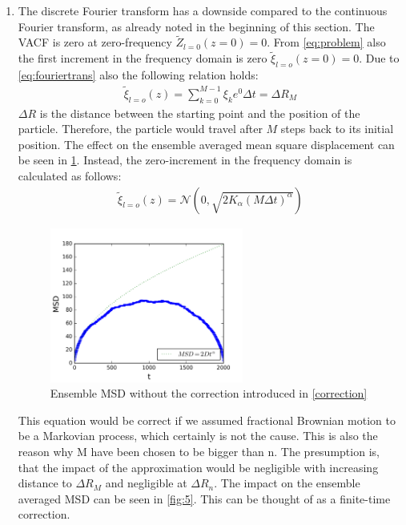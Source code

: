 \documentclass[
  a4paper,BCOR10mm,oneside,
  bibtotoc,idxtotoc,
  headsepline,footsepline,%
  fleqn,openbib
]{scrbook}
\begin{document}
\begin{enumerate}
 \item The discrete Fourier transform has a downside compared to the continuous Fourier transform, as already noted in the beginning of this section. The VACF is zero at zero-frequency $ \tilde{Z}_{l=0}(z=0)=0$.  From \cref{eq:problem} also the first increment in the frequency domain is zero $ \tilde{\xi}_{l=o}(z=0)= 0$. Due to \cref{eq:fouriertrans} also the following relation holds:
 \begin{align}
   \tilde{\xi}_{l=o}(z) = \sum_{k=0}^{M-1} \xi_k e^{0} \Delta t = \Delta  R_{M} \label{correction}
 \end{align}
$\Delta R $ is the distance between the starting point and the position of the particle. Therefore, the particle would travel after $M$ steps back to its initial position. The effect on the ensemble averaged mean square displacement can be seen in \cref{fig:6}. Instead, the zero-increment in the frequency domain is calculated as follows:
\begin{align}
 \tilde{\xi}_{l=o}(z) = \mathcal{N}(0,\sqrt{2 K_{\alpha} (M \Delta t)^\alpha})
\end{align}
\begin{figure}[h]
  \centering
  \includegraphics[width=0.6\textwidth]{./data/nocorrectionmsd.png}
    \caption{Ensemble MSD without the correction introduced in \cref{correction}  }
  \label{fig:6}
\end{figure}
This equation would be correct if we assumed fractional Brownian motion to be a Markovian process, which certainly is not the cause. This is also the reason why M have been chosen to be bigger than n. The presumption is, that the impact of the approximation would be negligible with increasing distance to $\Delta R_{M}$ and negligible at $\Delta R_{n}$. The impact on the ensemble averaged MSD can be seen in \cref{fig:5}. This can be thought of as a finite-time correction.
\begin{figure}[h]

\end{figure}
\end{enumerate}
\end{document}
